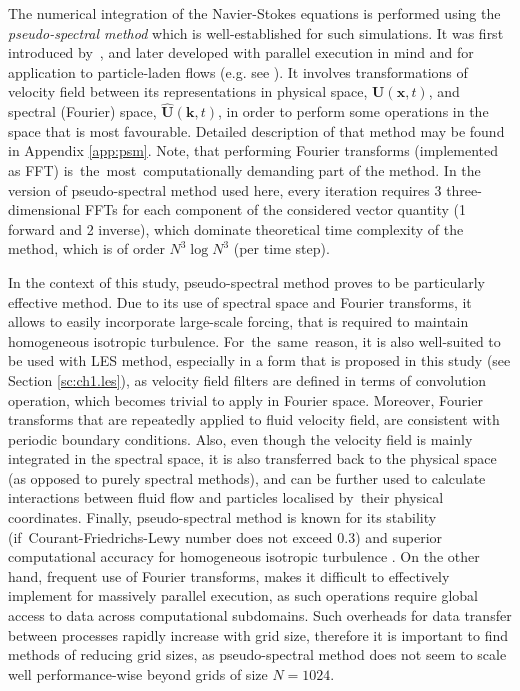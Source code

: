\documentclass{pracamgren}
\begin{document}
The numerical integration of the Navier-Stokes equations is performed using the \emph{pseudo-spectral method} which is well-established for such simulations.
It was first introduced by~\textcite{Orszag1972}, and later developed with parallel execution in mind and for application to particle-laden flows (e.g. see \textcite{Wang1993,Ayala2014,Parishani2015}).
It involves transformations of velocity field between its representations in physical space, $\textbf{U}(\textbf{x}, t)$, and spectral (Fourier) space, $\hat{\textbf{U}}(\textbf{k}, t)$, in order to perform some operations in the space that is most favourable.
Detailed description of that method may be found in Appendix \ref{app:psm}.
Note, that performing Fourier transforms (implemented as FFT) is~the~most~computationally  demanding part of the method.
In the version of pseudo-spectral method used here, every iteration requires 3 three-dimensional FFTs for each component of the considered vector quantity (1 forward and 2 inverse), which dominate theoretical time complexity of the method, which is of order $N^3 \log N^3$ (per time step).

In the context of this study, pseudo-spectral method proves to be particularly effective method.
Due to its use of spectral space and Fourier transforms, it allows to easily incorporate large-scale forcing, that is required to maintain homogeneous isotropic turbulence.
For~the~same~reason, it is also well-suited to be used with LES method, especially in a form that is proposed in this study (see Section \ref{sc:ch1.les}), as velocity field filters are defined in terms of convolution operation, which becomes trivial to apply in Fourier space.
Moreover, Fourier transforms that are repeatedly applied to fluid velocity field, are consistent with periodic boundary conditions.
Also, even though the velocity field is mainly integrated in the spectral space, it is also transferred back to the physical space (as opposed to purely spectral methods), and can be further used to calculate interactions between fluid flow and particles localised by~their physical coordinates.
Finally, pseudo-spectral method is known for its stability (if~Courant-Friedrichs-Lewy number does not exceed 0.3) and superior computational accuracy for homogeneous isotropic turbulence \parencite{Peng2009}.
On the other hand, frequent use of Fourier transforms, makes it difficult to effectively implement for massively parallel execution, as such operations require global access to data across computational subdomains.
Such overheads for data transfer between processes rapidly increase with grid size, therefore it is important to find methods of reducing grid sizes, as pseudo-spectral method does not seem to scale well performance-wise beyond grids of size $N=1024$.
\end{document}
